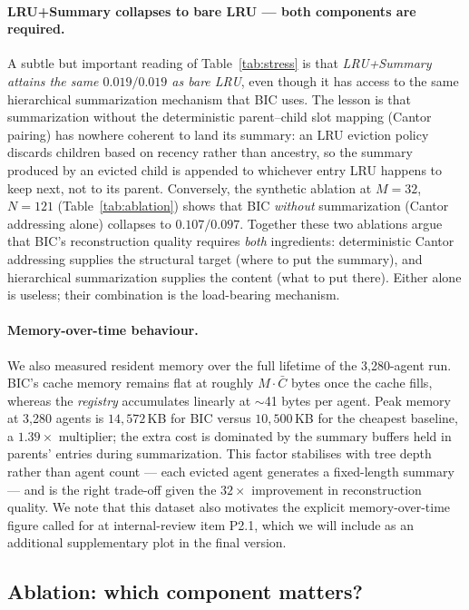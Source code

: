 \documentclass[fleqn,10pt]{article}
\theoremstyle{definition}
\newcommand{\slots}{M}
\begin{document}
\paragraph{LRU+Summary collapses to bare LRU --- both components are required.}
A subtle but important reading of Table~\ref{tab:stress} is that
\emph{LRU+Summary attains the same $0.019/0.019$ as bare LRU}, even
though it has access to the same hierarchical summarization
mechanism that BIC uses. The lesson is that summarization without
the deterministic parent--child slot mapping (Cantor pairing) has
nowhere coherent to land its summary: an LRU eviction policy
discards children based on recency rather than ancestry, so the
summary produced by an evicted child is appended to whichever entry
LRU happens to keep next, not to its parent. Conversely, the
synthetic ablation at $\slots{=}32$, $N{=}121$
(Table~\ref{tab:ablation}) shows that BIC \emph{without}
summarization (Cantor addressing alone) collapses to $0.107/0.097$.
Together these two ablations argue that BIC's reconstruction
quality requires \emph{both} ingredients: deterministic Cantor
addressing supplies the structural target (where to put the
summary), and hierarchical summarization supplies the content
(what to put there). Either alone is useless; their combination is
the load-bearing mechanism.

\paragraph{Memory-over-time behaviour.}
We also measured resident memory over the full lifetime of the
3,280-agent run. BIC's cache memory remains flat at roughly
$\slots \cdot \bar{C}$ bytes once the cache fills, whereas the
\emph{registry} accumulates linearly at $\sim$41 bytes per agent.
Peak memory at 3,280 agents is $14{,}572$\,KB for BIC versus
$10{,}500$\,KB for the cheapest baseline, a $1.39\times$ multiplier;
the extra cost is dominated by the summary buffers held in parents'
entries during summarization. This factor stabilises with tree depth
rather than agent count --- each evicted agent generates a
fixed-length summary --- and is the right trade-off given the
$32\times$ improvement in reconstruction quality. We note that this
dataset also motivates the explicit memory-over-time figure called
for at internal-review item P2.1, which we will include as an
additional supplementary plot in the final version.

\subsection*{Ablation: which component matters?}
\end{document}
